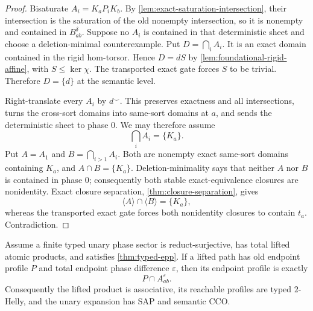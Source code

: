 \begin{proof}
Bisaturate $A_i=K_aP_iK_b$.  By
\cref{lem:exact-saturation-intersection}, their intersection is the
saturation of the old nonempty intersection, so it is nonempty and contained
in $B_{ab}^{\delta}$.  Suppose no $A_i$ is contained in that deterministic
sheet and choose a deletion-minimal counterexample.  Put $D=\bigcap_iA_i$.
It is an exact domain contained in the rigid hom-torsor.  Hence
$D=dS$ by \cref{lem:foundational-rigid-affine}, with
$S\le\ker\chi$.  The transported exact gate forces $S$ to be trivial.
Therefore $D=\{d\}$ at the semantic level.

Right-translate every $A_i$ by $d^{\smile}$.  This preserves exactness and all
intersections, turns the cross-sort domains into same-sort domains at $a$, and
sends the deterministic sheet to phase $0$.  We may therefore assume
\[
 \bigcap_iA_i=\{K_a\}.
\]
Put $A=A_1$ and $B=\bigcap_{i>1}A_i$.  Both are nonempty exact same-sort
domains containing $K_a$, and $A\cap B=\{K_a\}$.  Deletion-minimality says
that neither $A$ nor $B$ is contained in phase $0$; consequently both stable
exact-equivalence closures are nonidentity.  Exact closure separation,
\cref{thm:closure-separation}, gives
\[
 \langle A\rangle\cap\langle B\rangle=\{K_a\},
\]
whereas the transported exact gate forces both nonidentity closures to contain
$t_a$.  Contradiction.
\end{proof}

\begin{lemma}
\label{lem:phase-primality-sufficiency}
Assume a finite typed unary phase sector is reduct-surjective, has total lifted
atomic products, and satisfies \cref{thm:typed-epp}.  If a lifted path has old
endpoint profile $P$ and total endpoint phase difference $\varepsilon$, then
its endpoint profile is exactly
\[
 P\cap A_{ab}^{\varepsilon}.
\tag{9}\label{eq:lifted-profile-normal-form}
\]
Consequently the lifted product is associative, its reachable profiles are
typed $2$-Helly, and the unary expansion has SAP and semantic CCO.
\end{lemma}

